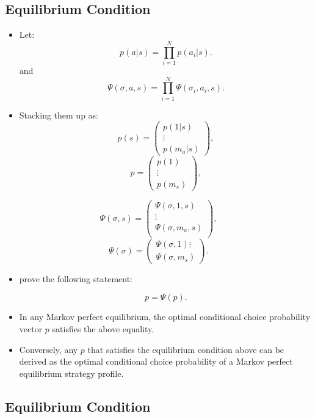 \documentclass[]{book}
\providecommand{\tightlist}{%
  \setlength{\itemsep}{0pt}\setlength{\parskip}{0pt}}
\begin{document}
\subsection{Equilibrium Condition}\label{equilibrium-condition-1}

\begin{itemize}
\tightlist
\item
  Let: \[
  p(a|s) = \prod_{i = 1}^N p(a_i|s).
  \] and \[
  \Psi(\sigma, a, s) = \prod_{i = 1}^N \Psi(\sigma_i, a_i, s).
  \]
\item
  Stacking them up as: \[
  p(s) = 
  \begin{pmatrix}
  p(1|s) \\
  \vdots \\
  p(m_a|s)
  \end{pmatrix},
  \] \[
  p = 
  \begin{pmatrix}
  p(1)\\
  \vdots\\
  p(m_s)
  \end{pmatrix},
  \]
\end{itemize}

\[
\Psi(\sigma, s) = 
\begin{pmatrix}
\Psi(\sigma, 1, s) \\
\vdots \\
\Psi(\sigma, m_a, s) \\
\end{pmatrix},
\] \[
\Psi(\sigma) = 
\begin{pmatrix}
\Psi(\sigma, 1)
\vdots\\
\Psi(\sigma, m_s)
\end{pmatrix}.
\]

\begin{itemize}
\tightlist
\item
  \citet{pesendorferAsymptoticLeastSquares2008} prove the following
  statement:

  \begin{equation}
  p = \Psi(p).
  \end{equation}
\item
  In any Markov perfect equilibrium, the optimal conditional choice
  probability vector \(p\) satisfies the above equality.
\item
  Conversely, any \(p\) that satisfies the equilibrium condition above
  can be derived as the optimal conditional choice probability of a
  Markov perfect equilibrium strategy profile.
\end{itemize}

\subsection{Equilibrium Condition}\label{equilibrium-condition-2}
\end{document}
